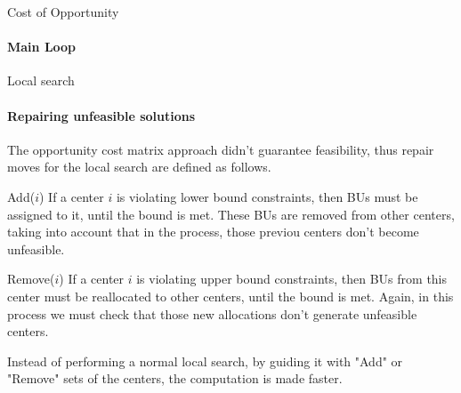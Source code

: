\documentclass{beamer}
\begin{document}
\begin{frame}{Cost of Opportunity}
    \framesubtitle{Main Loop}
\end{frame}

\begin{frame}{Local search}
    \framesubtitle{Repairing unfeasible solutions}
    \scriptsize The opportunity cost matrix approach didn't guarantee feasibility, thus repair moves for the local search are defined as follows.
        \begin{block}{Add($i$)}
        \centering
         \footnotesize If a center $i$ is violating lower bound constraints, then BUs must be assigned to it, until the bound is met. These BUs are removed from other centers, taking into account that in the process, those previou centers don't become unfeasible.
    \end{block}
    \begin{block}{Remove($i$)}
        \centering \footnotesize
        If a center $i$ is violating upper bound constraints, then BUs from this center must be reallocated to other centers, until the bound is met. Again, in this process we must check that those new allocations don't generate unfeasible centers.
    \end{block}
    Instead of performing a normal local search, by guiding it with "Add" or "Remove" sets of the centers, the computation is made faster.
\end{frame}
\end{document}
